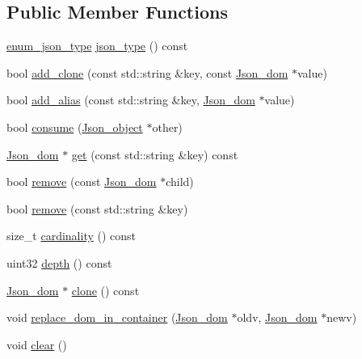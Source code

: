 \subsection*{Public Member Functions}
\begin{DoxyCompactItemize}
\item 
\mbox{\hyperlink{classJson__dom_af37eed7dfe1da1d6507d3ab85320eb03}{enum\+\_\+json\+\_\+type}} \mbox{\hyperlink{classJson__object_aa55889bf5bb56bea13f7ab005893637e}{json\+\_\+type}} () const
\item 
bool \mbox{\hyperlink{classJson__object_a9383baf9e13ae8a8d51a95fbca9bc1f3}{add\+\_\+clone}} (const std\+::string \&key, const \mbox{\hyperlink{classJson__dom}{Json\+\_\+dom}} $\ast$value)
\item 
bool \mbox{\hyperlink{classJson__object_aefbdc06876ad7e0b8a7a925df1bfb1ee}{add\+\_\+alias}} (const std\+::string \&key, \mbox{\hyperlink{classJson__dom}{Json\+\_\+dom}} $\ast$value)
\item 
bool \mbox{\hyperlink{classJson__object_a1446f0234194bec97b216d7eb42e790c}{consume}} (\mbox{\hyperlink{classJson__object}{Json\+\_\+object}} $\ast$other)
\item 
\mbox{\hyperlink{classJson__dom}{Json\+\_\+dom}} $\ast$ \mbox{\hyperlink{classJson__object_aadf27479595825213a12ab1a1f21ae2f}{get}} (const std\+::string \&key) const
\item 
bool \mbox{\hyperlink{classJson__object_af7b096486e0873bc9c023aeed6141310}{remove}} (const \mbox{\hyperlink{classJson__dom}{Json\+\_\+dom}} $\ast$child)
\item 
bool \mbox{\hyperlink{classJson__object_a10505fc7dde4d63422006c3c8e7702b2}{remove}} (const std\+::string \&key)
\item 
size\+\_\+t \mbox{\hyperlink{classJson__object_a7f3be77191de283316c29ac72cd3a4a5}{cardinality}} () const
\item 
uint32 \mbox{\hyperlink{classJson__object_a639ad387120ba5bea5372896f6e30c38}{depth}} () const
\item 
\mbox{\hyperlink{classJson__dom}{Json\+\_\+dom}} $\ast$ \mbox{\hyperlink{classJson__object_a2a723c5eb14d6532aa85097b9719f2c7}{clone}} () const
\item 
void \mbox{\hyperlink{classJson__object_a79f81022d00fc75981179d787d297add}{replace\+\_\+dom\+\_\+in\+\_\+container}} (\mbox{\hyperlink{classJson__dom}{Json\+\_\+dom}} $\ast$oldv, \mbox{\hyperlink{classJson__dom}{Json\+\_\+dom}} $\ast$newv)
\item 
void \mbox{\hyperlink{classJson__object_adb32a3a28d5bb946ab618872808aca3b}{clear}} ()

\end{DoxyCompactItemize}
